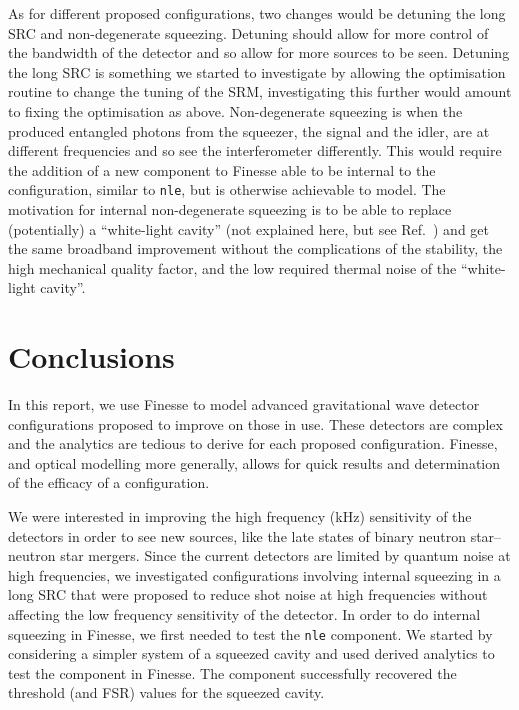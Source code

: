 \documentclass[aps,pra,superscriptaddress,reprint,nofootinbib]{revtex4-1}
\newcommand{\code}[1]{\texttt{#1}}
\begin{document}
As for different proposed configurations, two changes would be detuning the long SRC and non-degenerate squeezing. Detuning should allow for more control of the bandwidth of the detector and so allow for more sources to be seen.
Detuning the long SRC is something we started to investigate by allowing the optimisation routine to change the tuning of the SRM, investigating this further would amount to fixing the optimisation as above.
Non-degenerate squeezing is when the produced entangled photons from the squeezer, the signal and the idler, are at different frequencies and so see the interferometer differently. This would require the addition of a new component to Finesse able to be internal to the configuration, similar to \code{nle}, but is otherwise achievable to model. The motivation for internal non-degenerate squeezing is to be able to replace (potentially) a ``white-light cavity'' (not explained here, but see Ref.~\cite{white-light-resonators}) and get the same broadband improvement without the complications of the stability, the high mechanical quality factor, and the low required thermal noise of the ``white-light cavity''.




\section{Conclusions}
\label{sec:conclusions}

In this report, we use Finesse to model advanced gravitational wave detector configurations proposed to improve on those in use. These detectors are complex and the analytics are tedious to derive for each proposed configuration. Finesse, and optical modelling more generally, allows for quick results and determination of the efficacy of a configuration.


We were interested in improving the high frequency (kHz) sensitivity of the detectors in order to see new sources, like the late states of binary neutron star--neutron star mergers. Since the current detectors are limited by quantum noise at high frequencies, we investigated configurations involving internal squeezing in a long SRC that were proposed to reduce shot noise at high frequencies without affecting the low frequency sensitivity of the detector. In order to do internal squeezing in Finesse, we first needed to test the \code{nle} component. We started by considering a simpler system of a squeezed cavity and used derived analytics to test the component in Finesse. The component successfully recovered the threshold (and FSR) values for the squeezed cavity.
\end{document}
